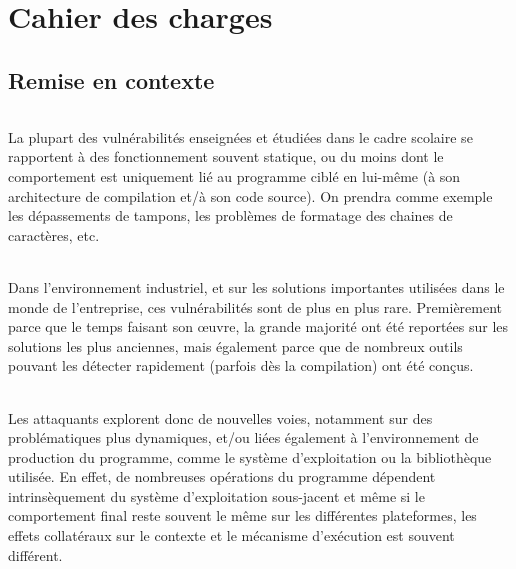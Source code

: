 \chapter{Cahier des charges}
\section{Remise en contexte}
\subparagraph{}
La plupart des vulnérabilités enseignées et étudiées dans le cadre scolaire
se rapportent à des fonctionnement souvent statique, ou du moins dont le comportement
est uniquement lié au programme ciblé en lui-même (à son architecture de compilation et/à
son code source). On prendra comme exemple les dépassements de tampons, les problèmes de
formatage des chaines de caractères, etc.\subparagraph{}
Dans l'environnement industriel, et sur les solutions importantes utilisées dans le monde
de l'entreprise, ces vulnérabilités sont de plus en plus rare. Premièrement parce que le temps
faisant son œuvre, la grande majorité ont été reportées sur les solutions les plus anciennes,
mais également parce que de nombreux outils pouvant les détecter rapidement (parfois dès la compilation)
ont été conçus.\subparagraph{}
Les attaquants explorent donc de nouvelles voies, notamment sur des problématiques plus dynamiques, et/ou
liées également à l'environnement de production du programme, comme le système d'exploitation ou la bibliothèque utilisée.
En effet, de nombreuses opérations du programme dépendent intrinsèquement du système d'exploitation sous-jacent et
même si le comportement final reste souvent le même sur les différentes plateformes, les effets collatéraux
sur le contexte et le mécanisme d'exécution est souvent différent.\subparagraph{}


